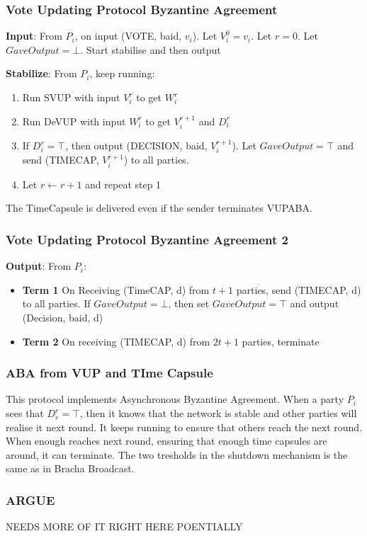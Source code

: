             \begin{frame}
                \frametitle{Vote Updating Protocol Byzantine Agreement}
                    \textbf{Input}: From $P_i$, on input (VOTE, baid, $v_i$). Let $V_{i}^0 = v_i$. Let $r = 0$. Let $GaveOutput = \bot$. Start stabilise and then output

                    \textbf{Stabilize}: From $P_i$, keep running:
                    \begin{enumerate}
                        \item Run SVUP with input $V_{i}^r$ to get $W_{i}^r$
                        \item Run DeVUP with input $W_{i}^r$ to get $V_{i}^{r+1}$ and $D_{i}^r$
                        \item If $D_{i}^r = \top$, then output (DECISION, baid, $V_{i}^{r+1}$). Let $GaveOutput = \top$ and send (TIMECAP, $V_{i}^{r+1}$) to all parties. 
                        \item Let $r \leftarrow r + 1$ and repeat step 1
                    \end{enumerate}
                    The TimeCapsule is delivered even if the sender terminates VUPABA. 
            \end{frame}
            \begin{frame}   
                \frametitle{Vote Updating Protocol Byzantine Agreement 2}
                    \textbf{Output}: From $P_i$:
                        \begin{itemize}
                            \item \textbf{Term 1} On Receiving (TimeCAP, d) from $t+1$ parties, send (TIMECAP, d) to all parties. If $GaveOutput = \bot$, then set $GaveOutput = \top$ and output (Decision, baid, d)
                            \item \textbf{Term 2} On receiving (TIMECAP, d) from $2t + 1$ parties, terminate
                        \end{itemize}
            \end{frame}

            \begin{frame}
                \frametitle{ABA from VUP and TIme Capsule}
                    This protocol implements Asynchronous Byzantine Agreement. When a party $P_i$ sees that $D_{r}^r = \top$, then it knows that the network is stable and other parties will realise it next round. It keeps running to ensure that others reach the next round. When enough reaches next round, ensuring that enough time capsules are around, it can terminate. The two tresholds in the shutdown mechanism is the same as in Bracha Broadcast. 
            \end{frame}

            \begin{frame}
                \frametitle{ARGUE }
                    NEEDS MORE OF IT RIGHT HERE POENTIALLY
                
            
            \end{frame}





